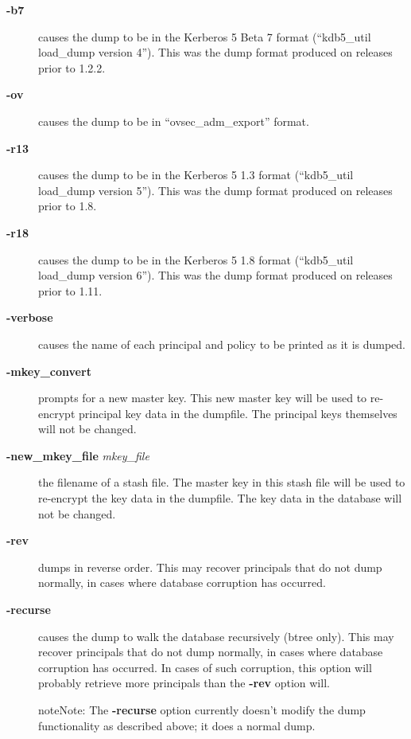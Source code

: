 \documentclass[letterpaper,10pt,english]{sphinxmanual}
\begin{document}
\begin{description}
\item[{\textbf{-b7}}] \leavevmode
causes the dump to be in the Kerberos 5 Beta 7 format (``kdb5\_util
load\_dump version 4'').  This was the dump format produced on
releases prior to 1.2.2.

\item[{\textbf{-ov}}] \leavevmode
causes the dump to be in ``ovsec\_adm\_export'' format.

\item[{\textbf{-r13}}] \leavevmode
causes the dump to be in the Kerberos 5 1.3 format (``kdb5\_util
load\_dump version 5'').  This was the dump format produced on
releases prior to 1.8.

\item[{\textbf{-r18}}] \leavevmode
causes the dump to be in the Kerberos 5 1.8 format (``kdb5\_util
load\_dump version 6'').  This was the dump format produced on
releases prior to 1.11.

\item[{\textbf{-verbose}}] \leavevmode
causes the name of each principal and policy to be printed as it
is dumped.

\item[{\textbf{-mkey\_convert}}] \leavevmode
prompts for a new master key.  This new master key will be used to
re-encrypt principal key data in the dumpfile.  The principal keys
themselves will not be changed.

\item[{\textbf{-new\_mkey\_file} \emph{mkey\_file}}] \leavevmode
the filename of a stash file.  The master key in this stash file
will be used to re-encrypt the key data in the dumpfile.  The key
data in the database will not be changed.

\item[{\textbf{-rev}}] \leavevmode
dumps in reverse order.  This may recover principals that do not
dump normally, in cases where database corruption has occurred.

\item[{\textbf{-recurse}}] \leavevmode
causes the dump to walk the database recursively (btree only).
This may recover principals that do not dump normally, in cases
where database corruption has occurred.  In cases of such
corruption, this option will probably retrieve more principals
than the \textbf{-rev} option will.

\begin{notice}{note}{Note:}
The \textbf{-recurse} option currently doesn't modify the dump
functionality as described above; it does a normal dump.
\end{notice}


\end{description}
\end{document}
